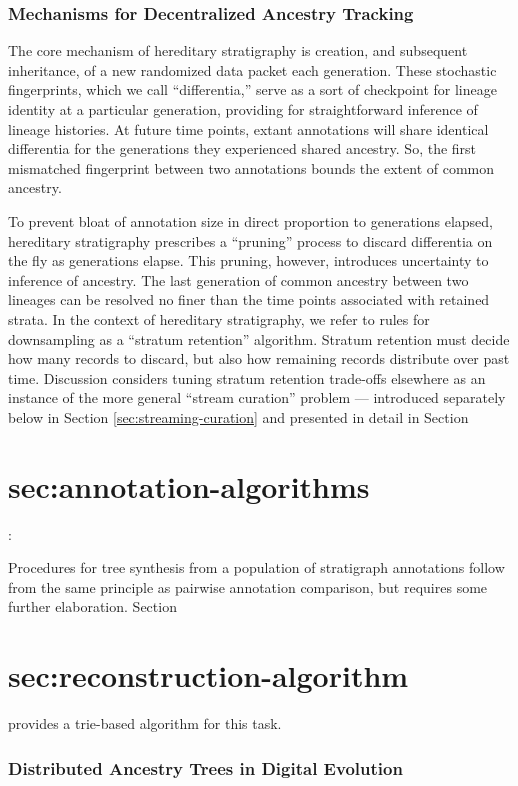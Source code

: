 \subsubsection{Mechanisms for Decentralized Ancestry Tracking}

The core mechanism of hereditary stratigraphy is creation, and subsequent inheritance, of a new randomized data packet each generation.
These stochastic fingerprints, which we call ``differentia,'' serve as a sort of checkpoint for lineage identity at a particular generation, providing for straightforward inference of lineage histories.
At future time points, extant annotations will share identical differentia for the generations they experienced shared ancestry.
So, the first mismatched fingerprint between two annotations bounds the extent of common ancestry.

To prevent bloat of annotation size in direct proportion to generations elapsed, hereditary stratigraphy prescribes a ``pruning'' process to discard   differentia on the fly as generations elapse.
This pruning, however, introduces uncertainty to inference of ancestry.
The last generation of common ancestry between two lineages can be resolved no finer than the time points associated with retained strata.
In the context of hereditary stratigraphy, we refer to rules for downsampling as a ``stratum retention'' algorithm.
Stratum retention must decide how many records to discard, but also how remaining records distribute over past time.
Discussion considers tuning stratum retention trade-offs elsewhere as an instance of the more general ``stream curation'' problem --- introduced separately below in Section \ref{sec:streaming-curation} and presented in detail in Section \section{sec:annotation-algorithms}:

Procedures for tree synthesis from a population of stratigraph annotations follow from the same principle as pairwise annotation comparison, but requires some further elaboration.
Section \section{sec:reconstruction-algorithm} provides a trie-based algorithm for this task.

\subsubsection{Distributed Ancestry Trees in Digital Evolution}

